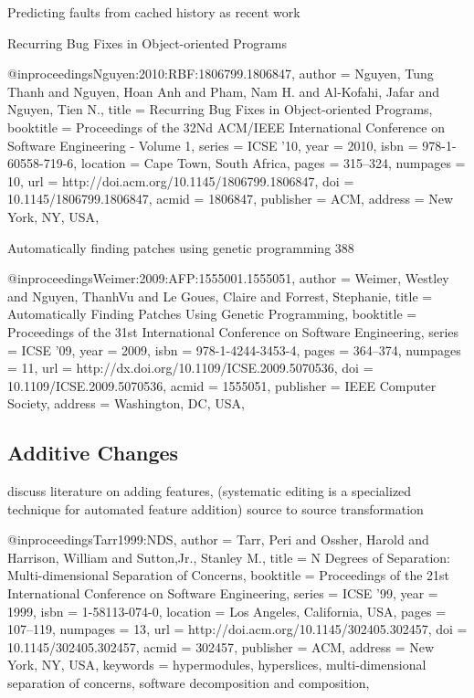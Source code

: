 \documentclass[runningheads,a4paper]{llncs}
\begin{document}
Predicting faults from cached history
as recent work

Recurring Bug Fixes in Object-oriented Programs

@inproceedings{Nguyen:2010:RBF:1806799.1806847,
 author = {Nguyen, Tung Thanh and Nguyen, Hoan Anh and Pham, Nam H. and Al-Kofahi, Jafar and Nguyen, Tien N.},
 title = {Recurring Bug Fixes in Object-oriented Programs},
 booktitle = {Proceedings of the 32Nd ACM/IEEE International Conference on Software Engineering - Volume 1},
 series = {ICSE '10},
 year = {2010},
 isbn = {978-1-60558-719-6},
 location = {Cape Town, South Africa},
 pages = {315--324},
 numpages = {10},
 url = {http://doi.acm.org/10.1145/1806799.1806847},
 doi = {10.1145/1806799.1806847},
 acmid = {1806847},
 publisher = {ACM},
 address = {New York, NY, USA},
}

Automatically finding patches using genetic programming 388

@inproceedings{Weimer:2009:AFP:1555001.1555051,
 author = {Weimer, Westley and Nguyen, ThanhVu and Le Goues, Claire and Forrest, Stephanie},
 title = {Automatically Finding Patches Using Genetic Programming},
 booktitle = {Proceedings of the 31st International Conference on Software Engineering},
 series = {ICSE '09},
 year = {2009},
 isbn = {978-1-4244-3453-4},
 pages = {364--374},
 numpages = {11},
 url = {http://dx.doi.org/10.1109/ICSE.2009.5070536},
 doi = {10.1109/ICSE.2009.5070536},
 acmid = {1555051},
 publisher = {IEEE Computer Society},
 address = {Washington, DC, USA},
} 



\subsection{Additive Changes}
discuss literature on adding features, (systematic editing is a specialized technique for automated feature addition) source to source transformation 


@inproceedings{Tarr1999:NDS,
	author = {Tarr, Peri and Ossher, Harold and Harrison, William and Sutton,Jr., Stanley M.},
 title = {N Degrees of Separation: Multi-dimensional Separation of Concerns},
 booktitle = {Proceedings of the 21st International Conference on Software Engineering},
 series = {ICSE '99},
 year = {1999},
 isbn = {1-58113-074-0},
 location = {Los Angeles, California, USA},
 pages = {107--119},
 numpages = {13},
 url = {http://doi.acm.org/10.1145/302405.302457},
 doi = {10.1145/302405.302457},
 acmid = {302457},
 publisher = {ACM},
 address = {New York, NY, USA},
 keywords = {hypermodules, hyperslices, multi-dimensional separation of concerns, software decomposition and composition},
} 
\end{document}

